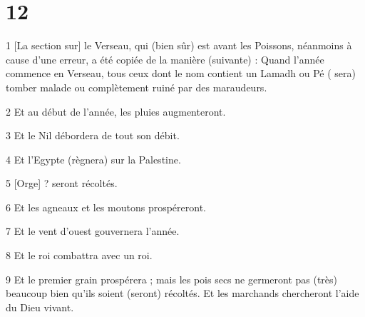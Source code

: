 \chapter{12}

\par 1 [La section sur] le Verseau, qui (bien sûr) est avant les Poissons, néanmoins à cause d'une erreur, a été copiée de la manière (suivante) : Quand l'année commence en Verseau, tous ceux dont le nom contient un Lamadh ou Pé ( sera) tomber malade ou complètement ruiné par des maraudeurs.

\par 2 Et au début de l'année, les pluies augmenteront.

\par 3 Et le Nil débordera de tout son débit.

\par 4 Et l'Egypte (règnera) sur la Palestine.

\par 5 [Orge] ? seront récoltés.

\par 6 Et les agneaux et les moutons prospéreront.

\par 7 Et le vent d'ouest gouvernera l'année.

\par 8 Et le roi combattra avec un roi.

\par 9 Et le premier grain prospérera ; mais les pois secs ne germeront pas (très) beaucoup bien qu'ils soient (seront) récoltés. Et les marchands chercheront l'aide du Dieu vivant.



